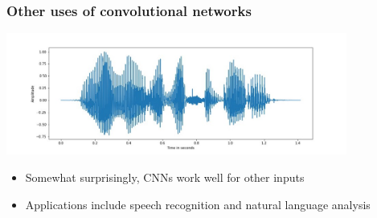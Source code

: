 \documentclass[10pt]{beamer}
\begin{document}
\begin{frame}
\frametitle{Other uses of convolutional networks}
\centerline{\includegraphics[height=4cm]{images/speech.png}}
\begin{itemize}
\item Somewhat surprisingly, CNNs work well for other inputs
\item Applications include {\color{red} speech recognition} and {\color{blue} natural language analysis}
\end{itemize}
\end{frame}
\end{document}
